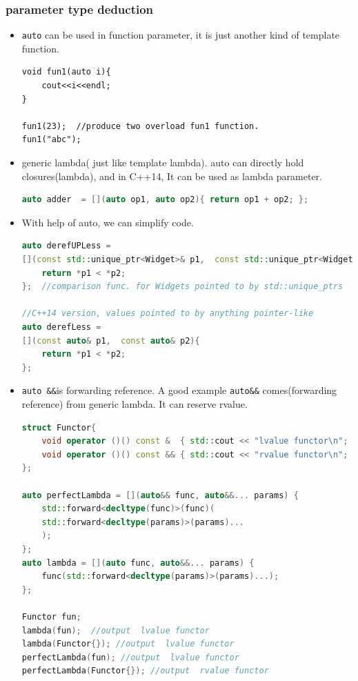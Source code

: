\documentclass[a4paper,11pt,twoside]{book}
\begin{document}
\subsubsection{parameter type deduction}
\begin{itemize}
	\item \texttt{auto} can be used in function parameter, it is just another kind of template function.

\begin{lstlisting}[numbers=none]
void fun1(auto i){
    cout<<i<<endl;
}
		
fun1(23);  //produce two overload fun1 function.
fun1("abc");
\end{lstlisting}
    \item generic lambda( just like template lambda). auto can directly hold closures(lambda), and in C++14, It can be used as lambda parameter.
\begin{lstlisting}[frame=single, language=c++]
auto adder  = [](auto op1, auto op2){ return op1 + op2; };
\end{lstlisting}
	
	\item With help of auto, we can simplify code. 
\begin{lstlisting}[frame=single, language=c++]
auto derefUPLess =               
[](const std::unique_ptr<Widget>& p1,  const std::unique_ptr<Widget>& p2){
	return *p1 < *p2; 
};  //comparison func. for Widgets pointed to by std::unique_ptrs               

//C++14 version, values pointed to by anything pointer-like
auto derefLess = 
[](const auto& p1,  const auto& p2){
	return *p1 < *p2; 
}; 
\end{lstlisting}
	

	\item \texttt{auto \&\&}is forwarding reference. A good example \texttt{auto\&\&} comes(forwarding reference) from generic lambda. It can reserve rvalue.
\begin{lstlisting}[frame=single, language=c++]
struct Functor{
    void operator ()() const &  { std::cout << "lvalue functor\n"; }
    void operator ()() const && { std::cout << "rvalue functor\n"; }
};

auto perfectLambda = [](auto&& func, auto&&... params) {
	std::forward<decltype(func)>(func)(
	std::forward<decltype(params)>(params)...
	);
};
auto lambda = [](auto func, auto&&... params) {
	func(std::forward<decltype(params)>(params)...);
};

Functor fun;
lambda(fun);  //output  lvalue functor
lambda(Functor{}); //output  lvalue functor
perfectLambda(fun); //output  lvalue functor
perfectLambda(Functor{}); //output  rvalue functor
    \end{lstlisting}

\end{itemize}
\end{document}
